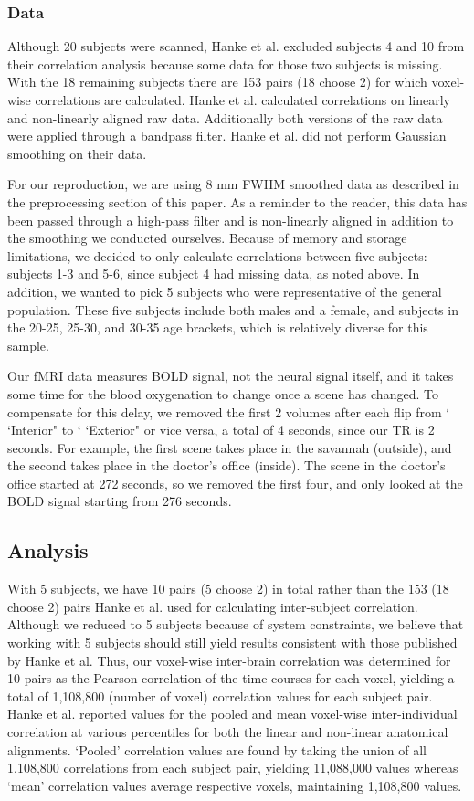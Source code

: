\documentclass[11pt]{article}
\begin{document}
\subsubsection{Data}
Although 20 subjects were scanned, Hanke et al. excluded subjects 4 and 10 
from their correlation analysis because some data for those two subjects is missing\cite{hank2014audiomovie}. With the 18 
remaining subjects there are 153 pairs (18 choose 2) for which voxel-wise 
correlations are calculated. Hanke et al. calculated correlations on linearly 
and non-linearly aligned raw data. Additionally both versions of the raw data were applied through a bandpass filter. Hanke et al. did not perform Gaussian smoothing on their data. 

For our reproduction, we are using 8 mm FWHM smoothed data as described in the preprocessing section of this paper. As a reminder to the reader, this data has been passed through a high-pass filter and is non-linearly aligned in addition to the smoothing we conducted ourselves. Because of memory and storage limitations, we decided to only calculate 
correlations between five subjects: subjects 1-3 and 5-6, since subject 4 
had missing data, as noted above.  In addition, we wanted to pick 5 
subjects who were representative of the general population.  These five 
subjects include both males and a female, and subjects in the 20-25, 25-30,
and 30-35 age brackets, which is relatively diverse for this sample.

Our fMRI data measures BOLD signal, not the neural signal itself, and it takes
some time for the blood oxygenation to change once a scene has changed.  To 
compensate for this delay, we removed the first 2 volumes after each flip from 
` `Interior" to ` `Exterior" or vice versa, a total of 4 seconds, since our TR is 2 
seconds.  For example, the first scene takes place in the savannah (outside), and the second takes place in the doctor's office (inside).  The scene in the doctor's office
started at 272 seconds, so we removed the first four, and only looked at the BOLD
signal starting from 276 seconds.

\subsection{Analysis}
With 5 subjects, we have 10 pairs (5 choose 2) 
in total rather than the 153
(18 choose 2) pairs Hanke et al. used for calculating inter-subject correlation.  Although we reduced to 5 subjects because of system constraints, we believe that working with 5 subjects should still yield results consistent with those published by Hanke et al.
Thus, our voxel-wise inter-brain correlation was determined for 10 pairs as the 
Pearson correlation of the time courses for each voxel, yielding a total of 1,108,800 (number of voxel) correlation values for each subject pair.
Hanke et al. reported values for the pooled and mean voxel-wise inter-individual correlation at various percentiles for both the linear and 
non-linear anatomical alignments. `Pooled' correlation values are found by taking the union of all 1,108,800 correlations from each subject pair, yielding 11,088,000 values whereas `mean' correlation values average respective voxels, maintaining 1,108,800 values. 
\end{document}
